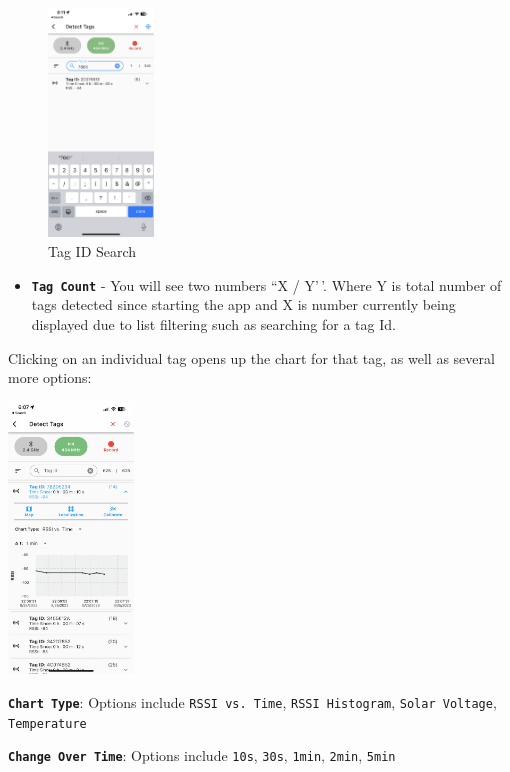 \documentclass[
]{article}
\providecommand{\tightlist}{%
  \setlength{\itemsep}{0pt}\setlength{\parskip}{0pt}}
\begin{document}
\begin{figure}
\hypertarget{id}{%
\centering
\includegraphics[width=0.25\textwidth,height=\textheight]{./images/sidekick_searchTagID.PNG}
\caption{Tag ID Search}\label{id}
}
\end{figure}

\begin{itemize}
\tightlist
\item
  \textbf{\texttt{Tag\ Count}} - You will see two numbers ``X / Y'\,'.
  Where Y is total number of tags detected since starting the app and X
  is number currently being displayed due to list filtering such as
  searching for a tag Id.
\end{itemize}

Clicking on an individual tag opens up the chart for that tag, as well
as several more options:

\includegraphics[width=0.25\textwidth,height=\textheight]{./images/sidekick_DetectTag.PNG}

\textbf{\texttt{Chart\ Type}}: Options include \texttt{RSSI\ vs.\ Time},
\texttt{RSSI\ Histogram}, \texttt{Solar\ Voltage}, \texttt{Temperature}

\textbf{\texttt{Change\ Over\ Time}}: Options include \texttt{10s},
\texttt{30s}, \texttt{1min}, \texttt{2min}, \texttt{5min}
\end{document}
